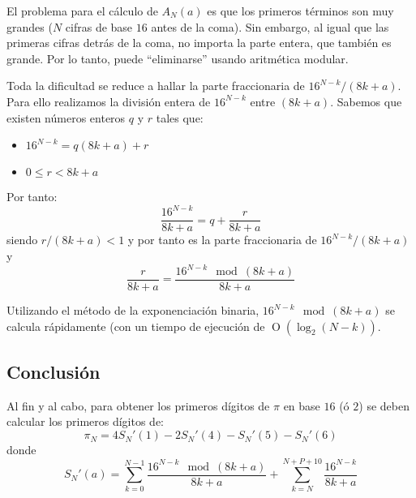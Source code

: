 El problema para el cálculo de $A_{N}(a)$ es que los primeros términos
son muy grandes ($N$ cifras de base $16$ antes de la coma). Sin
embargo, al igual que las primeras cifras detrás de la coma, no
importa la parte entera, que también es grande. Por lo tanto, puede
``eliminarse'' usando aritmética modular.

Toda la dificultad se reduce a hallar la parte fraccionaria de
$16^{N-k}/(8k+a)$. Para ello realizamos la división entera de
$16^{N-k}$ entre $(8k+a)$. Sabemos que existen números enteros $q$
y $r$ tales que:
\begin{itemize}
\item $16^{N-k}=q(8k+a)+r$
\item $0\leq r<8k+a$
\end{itemize}
Por tanto:
\begin{equation*}
  \frac{16^{N-k}}{8k+a}=q+\frac{r}{8k+a}
\end{equation*}
siendo $r/(8k+a)<1$ y por tanto es la parte fraccionaria de
$16^{N-k}/(8k+a)$ y
\begin{equation*}
  \frac{r}{8k+a}=\frac{16^{N-k}\mod (8k+a)}{8k+a}
\end{equation*}

Utilizando el método de la exponenciación binaria,
$16^{N-k}\mod (8k+a)$ se calcula rápidamente (con un tiempo de
ejecución de $\operatorname{O}(\log_{2}(N-k))$.

\subsection{Conclusión}

Al fin y al cabo, para obtener los primeros dígitos de $\pi$ en base
$16$ (ó $2$) se deben calcular los primeros dígitos de:
\begin{equation*}
  \pi_{N}=4S_{N}'(1)-2S_{N}'(4)-S_{N}'(5)-S_{N}'(6)
\end{equation*}
donde
\begin{equation*}
  S_{N}'(a) = \sum_{k=0}^{N-1}\frac{16^{N-k}\mod (8k+a)}{8k+a}
  +\sum_{k=N}^{N+P+10}\frac{16^{N-k}}{8k+a}
\end{equation*}